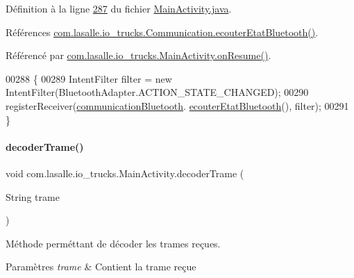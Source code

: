 Définition à la ligne \hyperlink{_main_activity_8java_source_l00287}{287} du fichier \hyperlink{_main_activity_8java_source}{Main\+Activity.\+java}.



Références \hyperlink{_communication_8java_source_l00068}{com.\+lasalle.\+io\+\_\+trucks.\+Communication.\+ecouter\+Etat\+Bluetooth()}.



Référencé par \hyperlink{_main_activity_8java_source_l00085}{com.\+lasalle.\+io\+\_\+trucks.\+Main\+Activity.\+on\+Resume()}.


\begin{DoxyCode}
00288     \{
00289         IntentFilter filter = \textcolor{keyword}{new} IntentFilter(BluetoothAdapter.ACTION\_STATE\_CHANGED);
00290         registerReceiver(\hyperlink{classcom_1_1lasalle_1_1io__trucks_1_1_main_activity_aef1818afc9c0d071330ccc244e4b3794}{communicationBluetooth}.
      \hyperlink{classcom_1_1lasalle_1_1io__trucks_1_1_communication_aee896ab782ae245bdb1177d3d80ba193}{ecouterEtatBluetooth}(), filter);
00291     \}
\end{DoxyCode}
\mbox{\label{classcom_1_1lasalle_1_1io__trucks_1_1_main_activity_afee6fb53a4414e7b577ea329fd473ba4}} 
\paragraph{\texorpdfstring{decoder\+Trame()}{decoderTrame()}}
{\footnotesize\ttfamily void com.\+lasalle.\+io\+\_\+trucks.\+Main\+Activity.\+decoder\+Trame (\begin{DoxyParamCaption}\item[{String}]{trame }\end{DoxyParamCaption})\hspace{0.3cm}{\ttfamily [private]}}



Méthode perméttant de décoder les trames reçues. 


\begin{DoxyParams}{Paramètres}
{\em trame} & Contient la trame reçue \\
\hline
\end{DoxyParams}


